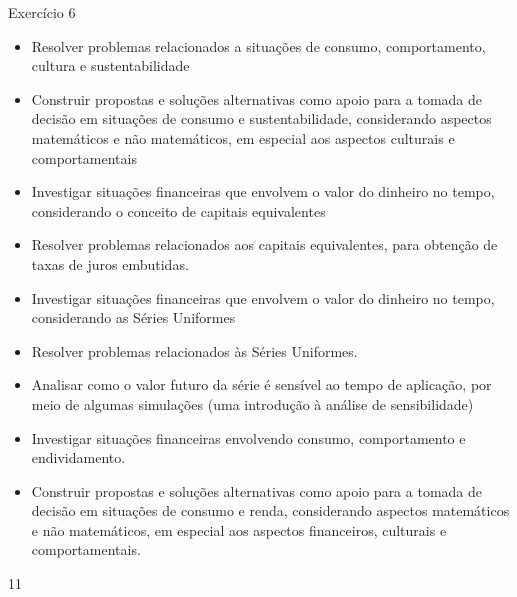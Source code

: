 \marginpar{\vspace{-2em}}
\begin{objectives}{Exercício 6}
{
\begin{itemize}
\item Resolver problemas relacionados a situações de consumo, comportamento, cultura e sustentabilidade
\item Construir propostas e soluções alternativas como apoio para a tomada de decisão em situações de consumo e sustentabilidade, considerando aspectos matemáticos e não matemáticos, em especial aos aspectos culturais e comportamentais
\end{itemize}

\begin{itemize}
\item Investigar situações financeiras que envolvem o valor do dinheiro no tempo, considerando o conceito de capitais equivalentes 
\item Resolver problemas relacionados aos capitais equivalentes, para obtenção de taxas de juros embutidas.
\end{itemize}

\begin{itemize}
\item Investigar situações financeiras que envolvem o valor do dinheiro no tempo, considerando as Séries Uniformes
\item Resolver problemas relacionados às Séries Uniformes.
\item Analisar como o valor futuro da série é sensível ao tempo de aplicação, por meio de algumas simulações (uma introdução à análise de sensibilidade)
\end{itemize}

\begin{itemize}
\item Investigar situações financeiras envolvendo consumo, comportamento e endividamento.
\item Construir propostas e soluções alternativas como apoio para a tomada de decisão em situações de consumo e renda, considerando aspectos matemáticos e não matemáticos, em especial aos aspectos financeiros, culturais e comportamentais.
\end{itemize}

}{1}{1}
\end{objectives}

